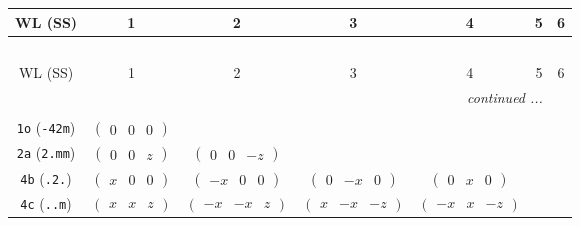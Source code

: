 \documentclass[fleqn,9pt,landscape]{jsarticle}
\begin{document}
\begin{center}
\renewcommand{\arraystretch}{1.2}
\begin{longtable}{ccccccc}
 \hline \hline
WL (SS) & 1 & 2 & 3 & 4 & 5 & 6 \\ \hline \endfirsthead

\multicolumn{6}{l}{\tablename\ \thetable{}} \\
 \hline \hline
WL (SS) & 1 & 2 & 3 & 4 & 5 & 6 \\ \hline \endhead

 \hline \hline
\multicolumn{6}{r}{\footnotesize\it continued ...} \\ \endfoot

 \hline \hline
\multicolumn{6}{r}{} \\ \endlastfoot

{\tt 1o} ({\tt -42m}) & $ \begin{pmatrix} 0 & 0 & 0 \end{pmatrix} $ & $  $ & $  $ & $  $ & $  $ & $  $ \\ \hline
{\tt 2a} ({\tt 2.mm}) & $ \begin{pmatrix} 0 & 0 & z \end{pmatrix} $ & $ \begin{pmatrix} 0 & 0 & - z \end{pmatrix} $ & $  $ & $  $ & $  $ & $  $ \\ \hline
{\tt 4b} ({\tt .2.}) & $ \begin{pmatrix} x & 0 & 0 \end{pmatrix} $ & $ \begin{pmatrix} - x & 0 & 0 \end{pmatrix} $ & $ \begin{pmatrix} 0 & - x & 0 \end{pmatrix} $ & $ \begin{pmatrix} 0 & x & 0 \end{pmatrix} $ & $  $ & $  $ \\ \hline
{\tt 4c} ({\tt ..m}) & $ \begin{pmatrix} x & x & z \end{pmatrix} $ & $ \begin{pmatrix} - x & - x & z \end{pmatrix} $ & $ \begin{pmatrix} x & - x & - z \end{pmatrix} $ & $ \begin{pmatrix} - x & x & - z \end{pmatrix} $ & $  $ & $  $ \\ \hline

\end{longtable}
\end{center}
\end{document}
